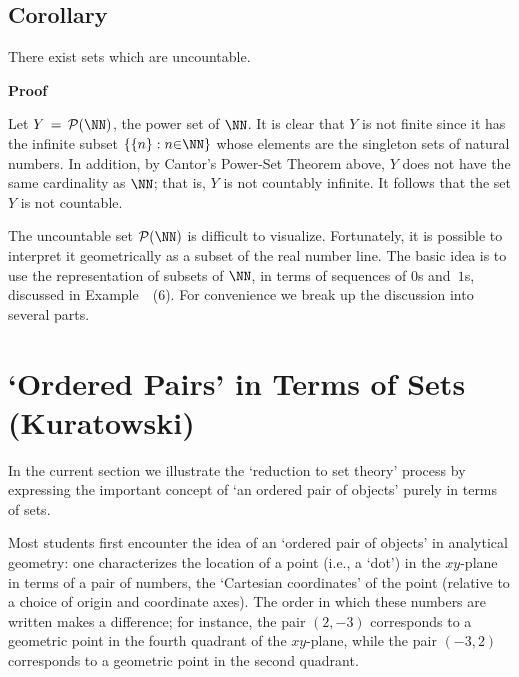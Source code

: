 {\V
\V

            \subsection{\small{\bf Corollary}}

        There exist sets which are uncountable.

\V

        {\bf Proof}\, 

\V

        Let $Y \,=\, {\cal P}({\NN})$, the power set of ${\NN}$.
    It is clear that $Y$ is not finite since it has the infinite subset
    $\{\{n\}: n{\in}{\NN}\}$ whose elements are the singleton sets of natural numbers.
    In addition, by Cantor's Power-Set Theorem above, $Y$ does not have the same cardinality as ${\NN}$;
    that is, $Y$ is not countably infinite. It follows that the set $Y$ is not countable.

\V
\V

        The uncountable set ${\cal P}({\NN})$ is difficult to visualize. Fortunately, it is possible to interpret it geometrically as a subset of the real number line.
    The basic idea is to use the representation of subsets of ${\NN}$, in terms of sequences of $0$s and~$1$s, discussed in Example~~(6).
    For convenience we break up the discussion into several parts.

\V



                        \section{`Ordered Pairs' in Terms of Sets (Kuratowski)}

\V


    In the current section we illustrate the `reduction to set theory' process by expressing the important concept of `an ordered pair of objects' purely in terms of sets.

        Most students first encounter the idea of an `ordered pair of objects' in analytical geometry:
    one characterizes the location of a point (i.e., a `dot') in the $xy$-plane in terms of a pair of numbers,
    the `Cartesian coordinates' of the point (relative to a choice of origin and coordinate axes).
    The order in which these numbers are written makes a difference; for instance,
    the pair $(2,-3)$ corresponds to a geometric point in the fourth quadrant of the $xy$-plane,
    while the pair $(-3,2)$ corresponds to a geometric point in the second quadrant.

}

